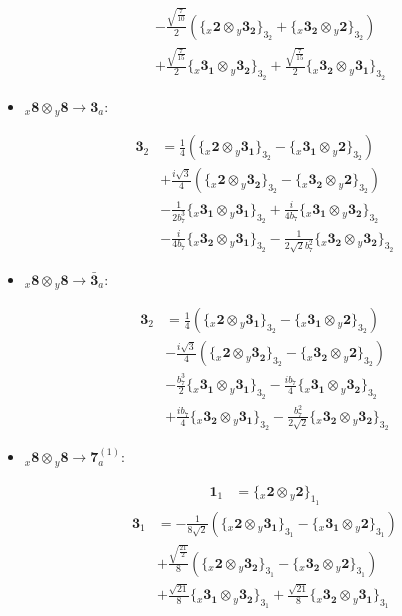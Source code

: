 \documentclass[english]{article}
\newcommand{\rep}[1]{\mathbf{#1}}
\newcommand{\repx}[2]{{}_{#2}\mathbf{#1}}
\newcommand{\tsprodx}[2]{\repx{#1}{x}\otimes\repx{#2}{y}}
\newcommand{\subcgs}[3]{\big\{ \tsprodx{#1}{#2}\big\}^{}_{#3}}
\begin{document}
\begin{itemize}
\begin{fleqn}
\begin{align*}
 & -\frac{\sqrt{\frac{7}{10}}}{2}\left(\subcgs{2}{3_{2}}{3_{2}}+\subcgs{3_{2}}{2}{3_{2}}\right) \\ 
 & +\frac{\sqrt{\frac{7}{15}}}{2}\subcgs{3_{1}}{3_{2}}{3_{2}}+\frac{\sqrt{\frac{7}{15}}}{2}\subcgs{3_{2}}{3_{1}}{3_{2}}
\end{align*}
\end{fleqn}
\item $\tsprodx{8}{8}\to\rep{3}_{a}$:
\begin{fleqn}
\begin{align*}
\rep{3}_{2} & = \frac{1}{4}\left(\subcgs{2}{3_{1}}{3_{2}}-\subcgs{3_{1}}{2}{3_{2}}\right) \\ 
 & +\frac{i \sqrt{3}}{4}\left(\subcgs{2}{3_{2}}{3_{2}}-\subcgs{3_{2}}{2}{3_{2}}\right) \\ 
 & -\frac{1}{2 b_7^3}\subcgs{3_{1}}{3_{1}}{3_{2}}+\frac{i}{4 b_7}\subcgs{3_{1}}{3_{2}}{3_{2}} \\ 
 & -\frac{i}{4 b_7}\subcgs{3_{2}}{3_{1}}{3_{2}}-\frac{1}{2 \sqrt{2} b_7^2}\subcgs{3_{2}}{3_{2}}{3_{2}}
\end{align*}
\end{fleqn}
\item $\tsprodx{8}{8}\to\rep{\bar{3}}_{a}$:
\begin{fleqn}
\begin{align*}
\rep{3}_{2} & = \frac{1}{4}\left(\subcgs{2}{3_{1}}{3_{2}}-\subcgs{3_{1}}{2}{3_{2}}\right) \\ 
 & -\frac{i \sqrt{3}}{4}\left(\subcgs{2}{3_{2}}{3_{2}}-\subcgs{3_{2}}{2}{3_{2}}\right) \\ 
 & -\frac{b_7^3}{2}\subcgs{3_{1}}{3_{1}}{3_{2}}-\frac{i b_7}{4}\subcgs{3_{1}}{3_{2}}{3_{2}} \\ 
 & +\frac{i b_7}{4}\subcgs{3_{2}}{3_{1}}{3_{2}}-\frac{b_7^2}{2 \sqrt{2}}\subcgs{3_{2}}{3_{2}}{3_{2}}
\end{align*}
\end{fleqn}
\item $\tsprodx{8}{8}\to\rep{7}_{a}^{(1)}$:
\begin{fleqn}
\begin{align*}
\rep{1}_{1} & = \subcgs{2}{2}{1_{1}}
\end{align*}
\begin{align*}
\rep{3}_{1} & = -\frac{1}{8 \sqrt{2}}\left(\subcgs{2}{3_{1}}{3_{1}}-\subcgs{3_{1}}{2}{3_{1}}\right) \\ 
 & +\frac{\sqrt{\frac{21}{2}}}{8}\left(\subcgs{2}{3_{2}}{3_{1}}-\subcgs{3_{2}}{2}{3_{1}}\right) \\ 
 & +\frac{\sqrt{21}}{8}\subcgs{3_{1}}{3_{2}}{3_{1}}+\frac{\sqrt{21}}{8}\subcgs{3_{2}}{3_{1}}{3_{1}}

\end{align*}
\end{fleqn}
\end{itemize}
\end{document}
